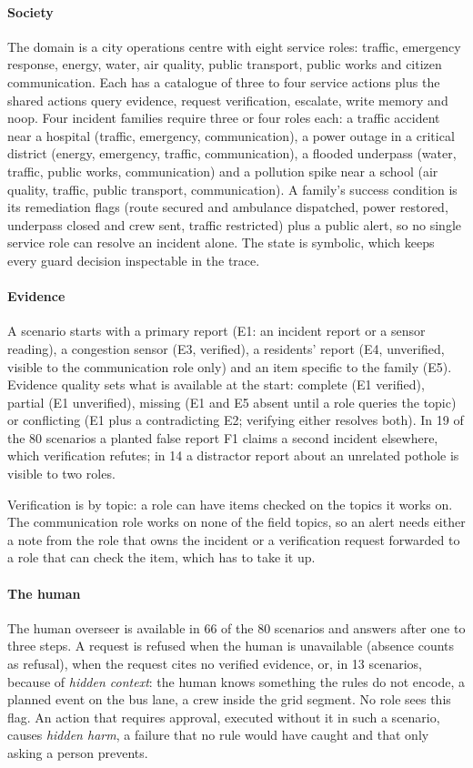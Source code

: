 \documentclass[10pt,conference]{IEEEtran}
\begin{document}
\paragraph{Society}
The domain is a city operations centre with eight service roles: traffic, emergency response, energy, water, air quality, public transport, public works and citizen communication. Each has a catalogue of three to four service actions plus the shared actions query evidence, request verification, escalate, write memory and noop. Four incident families require three or four roles each: a traffic accident near a hospital (traffic, emergency, communication), a power outage in a critical district (energy, emergency, traffic, communication), a flooded underpass (water, traffic, public works, communication) and a pollution spike near a school (air quality, traffic, public transport, communication). A family's success condition is its remediation flags (route secured and ambulance dispatched, power restored, underpass closed and crew sent, traffic restricted) plus a public alert, so no single service role can resolve an incident alone. The state is symbolic, which keeps every guard decision inspectable in the trace.

\paragraph{Evidence}
A scenario starts with a primary report (E1: an incident report or a sensor reading), a congestion sensor (E3, verified), a residents' report (E4, unverified, visible to the communication role only) and an item specific to the family (E5). Evidence quality sets what is available at the start: complete (E1 verified), partial (E1 unverified), missing (E1 and E5 absent until a role queries the topic) or conflicting (E1 plus a contradicting E2; verifying either resolves both). In 19 of the 80 scenarios a planted false report F1 claims a second incident elsewhere, which verification refutes; in 14 a distractor report about an unrelated pothole is visible to two roles.

Verification is by topic: a role can have items checked on the topics it works on. The communication role works on none of the field topics, so an alert needs either a note from the role that owns the incident or a verification request forwarded to a role that can check the item, which has to take it up.

\paragraph{The human}
The human overseer is available in 66 of the 80 scenarios and answers after one to three steps. A request is refused when the human is unavailable (absence counts as refusal), when the request cites no verified evidence, or, in 13 scenarios, because of \emph{hidden context}: the human knows something the rules do not encode, a planned event on the bus lane, a crew inside the grid segment. No role sees this flag. An action that requires approval, executed without it in such a scenario, causes \emph{hidden harm}, a failure that no rule would have caught and that only asking a person prevents.
\end{document}
